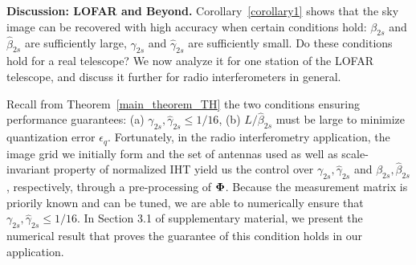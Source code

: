 \documentclass{article}
\begin{document}
{\bf Discussion: LOFAR and Beyond.}
Corollary~\ref{corollary1} shows that the sky image 
can be recovered with high accuracy when certain conditions  hold:
${\beta}_{2s}$ and $\hat{\beta}_{2s}$ are sufficiently large, ${\gamma}_{2s}$ and $\hat{\gamma}_{2s}$
are sufficiently small. Do these conditions hold for a real telescope? We now analyze it for one station of the LOFAR telescope, and discuss it further for radio interferometers in general.

 Recall from Theorem~\ref{main_theorem_TH} the two conditions ensuring  performance guarantees: (a) $\gamma_{2s}, \hat{\gamma}_{2s} \leq 1/16$, (b) ${L}/{\hat{\beta}_{2s}}$ must be large to minimize quantization error $ {\epsilon}_q$. Fortunately, in the radio interferometry application, the image grid we initially form and the set of antennas used as well as scale-invariant property of normalized IHT yield us the control over $\gamma_{2s}, \hat{\gamma}_{2s}$ and ${\beta}_{2s}, \hat{\beta}_{2s}$, respectively, through a pre-processing of ${\bf \Phi}$. 
Because the measurement matrix is priorily known and can be tuned, we are able to numerically ensure that ${\gamma}_{2s}, \hat{\gamma}_{2s}\leq 1/16$.
In Section 3.1 of supplementary material, we present the numerical result that proves the guarantee of this condition holds in our application.
\end{document}
